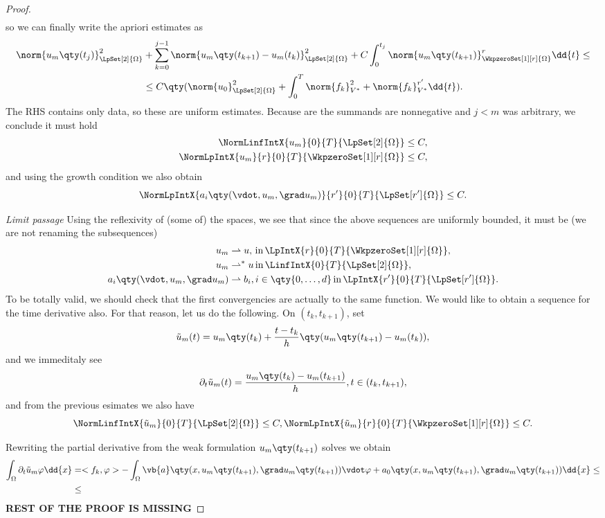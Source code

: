 \begin{proof}
\begin{align*}
	\end{align*}
	so we can finally write the apriori estimates as 
	\begin{align*}
		\norm{u_m\qty(t_j)}_{\LpSet[2]{\Omega}}^{2} &+ \sum_{k=0}^{j-1}\norm{u_m\qty(t_{k+1}) - u_m(t_k)}_{\LpSet[2]{\Omega}}^{2} + C\int_0^{t_j}\norm{u_m\qty(t_{k+1})}_{\WkpzeroSet[1][r]{\Omega}}^r \dd{t} \leq \\
	&\leq C\qty(\norm{u_0}_{\LpSet[2]{\Omega}}^{2} + \int_0^{T}\norm{f_k}_{V^{*}}^{2} + \norm{f_k}_{V^{*}}^{r'}\dd{t}).
	\end{align*}
	The RHS contains only data, so these are uniform estimates. Because are the summands are nonnegative and $j < m$ was arbitrary, we conclude it must hold
	\begin{align*}
		\NormLinfIntX{u_m}{0}{T}{\LpSet[2]{\Omega}} &\leq C, \\
		\NormLpIntX{u_m}{r}{0}{T}{\WkpzeroSet[1][r]{\Omega}} &\leq C, \\
	\end{align*}
	and using the growth condition we also obtain
	\[
		\NormLpIntX{a_i\qty(\vdot, u_m, \grad u_m)}{r'}{0}{T}{\LpSet[r']{\Omega}} \leq C.
	\]


	\textit{Limit passage}
	Using the reflexivity of (some of) the spaces, we see that since the above sequences are uniformly bounded, it must be (we are not renaming the subsequences)
	\begin{align*}
		u_m &\rightharpoonup u, \, \text{in} \, \LpIntX{r}{0}{T}{\WkpzeroSet[1][r]{\Omega}}, \\
		u_m &\rightharpoonup^* u \, \text{in} \, \LinfIntX{0}{T}{\LpSet[2]{\Omega}}, \\
		a_i\qty(\vdot, u_m, \grad u_m) &\rightharpoonup b_i , i \in \qty{0, \dots, d} \, \text{in} \, \LpIntX{r'}{0}{T}{\LpSet[r']{\Omega}}.
	\end{align*}
	To be totally valid, we should check that the first convergencies are actually to the same function. We would like to obtain a sequence for the time derivative also. For that reason, let us do the following. On $(t_k, t_{k+1})$, set
	\[
		\tilde{u}_m(t) = u_m\qty(t_k) + \frac{t-t_k}{h}\qty(u_m\qty(t_{k+1})-u_m(t_k)),
	\]
	and we immeditaly see
	\[
		\partial_t \tilde{u}_m(t) = \frac{u_m\qty(t_k) - u_m(t_{k+1})}{h},t \in (t_k, t_{k+1}),
	\]
	and from the previous esimates we also have
	\[
		\NormLinfIntX{\tilde{u}_m}{0}{T}{\LpSet[2]{\Omega}} \leq C,\NormLpIntX{\tilde{u}_m}{r}{0}{T}{\WkpzeroSet[1][r]{\Omega}} \leq C.
	\]
	
	Rewriting the partial derivative from the weak formulation $u_m\qty(t_{k+1})$ solves we obtain
	\begin{align*}
		\int_{\Omega}\partial_t \tilde{u}_m \varphi \dd{x} &= <f_k, \varphi> - \int_{\Omega}\vb{a}\qty(x, u_m\qty(t_{k+1}), \grad u_m\qty(t_{k+1}))\vdot \varphi + a_0\qty(x, u_m\qty(t_{k+1}), \grad u_m\qty(t_{k+1}))\dd{x} \leq \\
								   &\leq
	\end{align*}
	\textbf{REST OF THE PROOF IS MISSING}
\end{proof}


